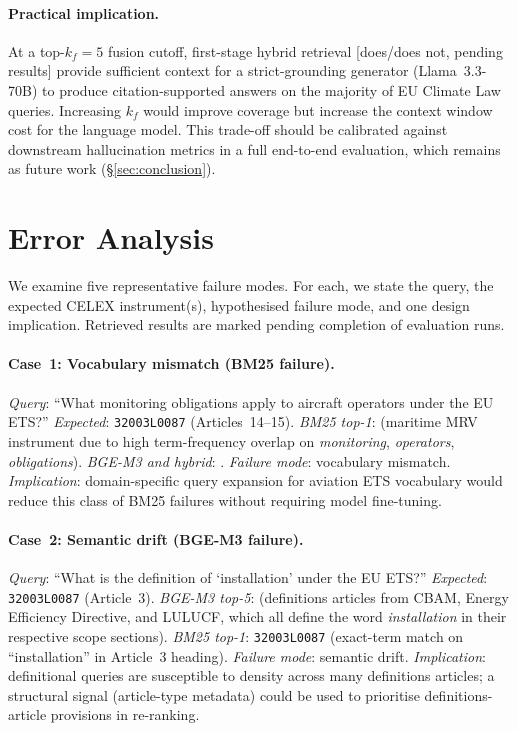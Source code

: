 \documentclass{iosart2x}
\newcommand{\PH}{\text{[PLACEHOLDER]}\xspace}
\newcommand{\bgem}{BGE-M3\xspace}
\begin{document}
\paragraph{Practical implication.}
At a top-$k_f{=}5$ fusion cutoff, first-stage hybrid retrieval
[does/does not, pending results] provide sufficient context for a
strict-grounding generator (Llama~3.3-70B) to produce citation-supported
answers on the majority of EU Climate Law queries.  Increasing $k_f$
would improve coverage but increase the context window cost for the
language model.  This trade-off should be calibrated against downstream
hallucination metrics in a full end-to-end evaluation, which remains
as future work (\S\ref{sec:conclusion}).

\section{Error Analysis}
\label{sec:error}

We examine five representative failure modes.  For each, we state the
query, the expected CELEX instrument(s), hypothesised failure mode,
and one design implication.  Retrieved results are marked \PH{} pending
completion of evaluation runs.

\paragraph{Case~1: Vocabulary mismatch (BM25 failure).}
\textit{Query}: ``What monitoring obligations apply to aircraft operators
under the EU ETS?''
\textit{Expected}: \texttt{32003L0087} (Articles~14--15).
\textit{BM25 top-1}: \PH{} (maritime MRV instrument due to high
term-frequency overlap on \textit{monitoring}, \textit{operators},
\textit{obligations}).
\textit{\bgem{} and hybrid}: \PH.
\textit{Failure mode}: vocabulary mismatch.
\textit{Implication}: domain-specific query expansion for aviation
ETS vocabulary would reduce this class of BM25 failures without
requiring model fine-tuning.

\paragraph{Case~2: Semantic drift (\bgem{} failure).}
\textit{Query}: ``What is the definition of `installation' under the EU ETS?''
\textit{Expected}: \texttt{32003L0087} (Article~3).
\textit{\bgem{} top-5}: \PH{} (definitions articles from CBAM, Energy
Efficiency Directive, and LULUCF, which all define the word
\textit{installation} in their respective scope sections).
\textit{BM25 top-1}: \texttt{32003L0087} (exact-term match on
``installation'' in Article~3 heading).
\textit{Failure mode}: semantic drift.
\textit{Implication}: definitional queries are susceptible to density
across many definitions articles; a structural signal (article-type
metadata) could be used to prioritise definitions-article provisions
in re-ranking.
\end{document}
